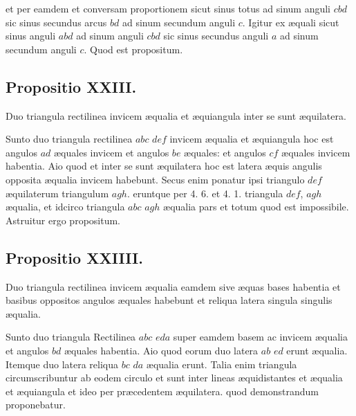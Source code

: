 \documentclass[11pt,a4paper]{article}
\begin{document}
et per eamdem et conversam proportionem sicut sinus totus ad sinum anguli $cbd$ sic sinus secundus arcus $bd$ ad sinum secundum anguli $c$. Igitur ex æquali sicut sinus anguli $abd$ ad sinum anguli $cbd$ sic sinus secundus anguli $a$ ad sinum secundum anguli $c$. Quod est propositum.

\subsection*{Propositio XXIII.}

Duo triangula rectilinea invicem æqualia et æquiangula inter se sunt æquilatera.

Sunto duo triangula rectilinea $abc$ $def$ invicem æqualia et æquiangula hoc est angulos $ad$ æquales invicem et angulos $be$ æquales: et angulos $cf$ æquales invicem habentia. Aio quod et inter se sunt æquilatera hoc est latera æquis angulis opposita æqualia invicem habebunt. Secus enim ponatur ipsi triangulo $def$ æquilaterum triangulum $agh$. eruntque per 4. 6. et 4. 1. triangula $def$, $agh$ æqualia, et idcirco triangula $abc$ $agh$ æqualia pars et totum quod est impossibile. Astruitur ergo propositum.

\subsection*{Propositio XXIIII.}

Duo triangula rectilinea invicem æqualia eamdem sive æquas bases habentia et basibus oppositos angulos æquales habebunt et reliqua latera singula singulis æqualia.

Sunto duo triangula Rectilinea $abc$ $eda$ super eamdem basem ac invicem æqualia et angulos $bd$ æquales habentia. Aio quod eorum duo latera $ab$ $ed$ erunt æqualia. Itemque duo latera reliqua $bc$ $da$ æqualia erunt. Talia enim triangula circumscribuntur ab eodem circulo et sunt inter lineas æquidistantes et æqualia et æquiangula et ideo per præcedentem æquilatera. quod demonstrandum proponebatur.
\end{document}
